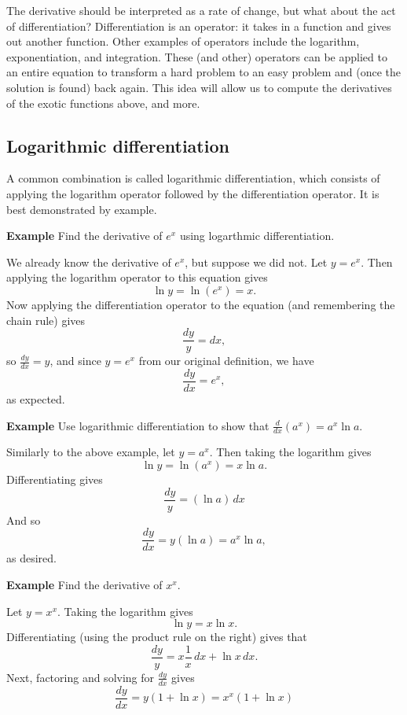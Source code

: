 \documentclass[twoside,openright,titlepage,a4paper]{book}
\begin{document}
\begin{sloppypar}
The derivative should be interpreted as a rate of change, but what about the act of differentiation? Differentiation is an operator: it takes in a function and gives out another function. Other examples of operators include the logarithm, exponentiation, and integration. These (and other) operators can be applied to an entire equation to transform a hard problem to an easy problem and (once the solution is found) back again. This idea will allow us to compute the derivatives of the exotic functions above, and more.

\subsection{Logarithmic differentiation}
A common combination is called logarithmic differentiation, which consists of applying the logarithm operator followed by the differentiation operator. It is best demonstrated by example.

\textbf{Example} Find the derivative of $e^x$ using logarthmic differentiation. 
\begin{examplebox}
We already know the derivative of $e^x$, but suppose we did not. Let $y = e^x$. Then applying the logarithm operator to this equation gives \[ \ln y = \ln(e^x) = x. \]
Now applying the differentiation operator to the equation (and remembering the chain rule) gives \[ \frac{dy}{y} = dx, \] so $\frac{dy}{dx} = y$, and since $y=e^x$ from our original definition, we have \[ \frac{dy}{dx} = e^x, \] as expected.
\end{examplebox}

\textbf{Example} Use logarithmic differentiation to show that $\frac{d}{dx}(a^x) = a^x \ln a$. 
\begin{examplebox}
Similarly to the above example, let $y = a^x$. Then taking the logarithm gives \[ \ln y = \ln(a^x) = x \ln a. \]
Differentiating gives \[ \frac{dy}{y} = (\ln a) \, dx \]
And so \[ \frac{dy}{dx} = y (\ln a) = a^x \ln a, \] as desired.	
\end{examplebox}

\textbf{Example} Find the derivative of $x^x$.
\begin{examplebox}
Let $y=x^x$. Taking the logarithm gives \[ \ln y = x \ln x. \]
Differentiating (using the product rule on the right) gives that \[ \frac{dy}{y} = x \frac{1}{x}\,dx + \ln x\,dx. \]
Next, factoring and solving for $\frac{dy}{dx}$ gives \[ \frac{dy}{dx} = y(1+\ln x) = x^x(1+\ln x) \]	
\end{examplebox}	


\end{sloppypar}
\end{document}
